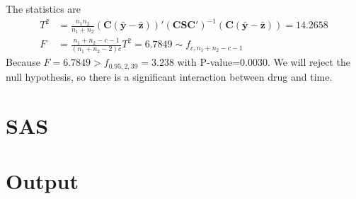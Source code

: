 \documentclass[letterpaper, 12pt]{article}
\newcommand{\ba}{$$\begin{aligned}}
\newcommand{\ea}{\end{aligned}$$}
\begin{document}
\begin{enumerate}[i]
The statistics are
\ba
T^2&=\frac{n_1n_2}{n_1+n_2}(\bm{C(\bar{y}-\bar{z})})'(\bm{CSC}')^{-1}(\bm{C(\bar{y}-\bar{z})})=14.2658\\
F&=\frac{n_1+n_2-c-1}{(n_1+n_2-2)c}T^2=6.7849\sim f_{c,n_1+n_2-c-1}
\ea
Because $F=6.7849>f_{0.95,2,39}=3.238$ with P-value=0.0030. We will reject the null hypothesis, so there is a significant interaction between drug and time.



\end{enumerate}













\begin{appendices}
\section{SAS}
\section{Output}

\end{appendices}








\end{document}
